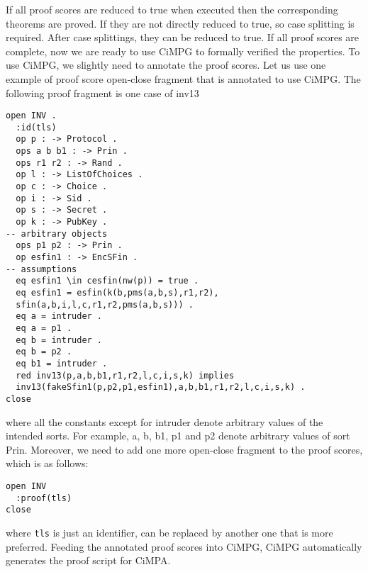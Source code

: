 \documentclass[a4paper,fleqn]{cas-dc}
\begin{document}
If all proof scores are reduced to true when executed then the corresponding theorems are proved. If they are not directly reduced to true, so case splitting is required. After case splittings, they can be reduced to true. If all proof scores are complete, now we are ready to use CiMPG to formally verified the properties. To use CiMPG, we slightly need to annotate the proof scores. Let us use one example of proof score open-close fragment that is annotated to use CiMPG. The following proof fragment is one case of inv13
\begin{small}
\begin{verbatim}
open INV .
  :id(tls)
  op p : -> Protocol .
  ops a b b1 : -> Prin .
  ops r1 r2 : -> Rand .
  op l : -> ListOfChoices .
  op c : -> Choice .
  op i : -> Sid .
  op s : -> Secret .
  op k : -> PubKey .
-- arbitrary objects
  ops p1 p2 : -> Prin .
  op esfin1 : -> EncSFin .
-- assumptions
  eq esfin1 \in cesfin(nw(p)) = true .
  eq esfin1 = esfin(k(b,pms(a,b,s),r1,r2),
  sfin(a,b,i,l,c,r1,r2,pms(a,b,s))) .
  eq a = intruder .
  eq a = p1 .
  eq b = intruder .
  eq b = p2 .
  eq b1 = intruder . 
  red inv13(p,a,b,b1,r1,r2,l,c,i,s,k) implies
  inv13(fakeSfin1(p,p2,p1,esfin1),a,b,b1,r1,r2,l,c,i,s,k) .
close
\end{verbatim}
\end{small}
where all the constants except for intruder denote arbitrary
values of the intended sorts. For example, a, b, b1, p1 and p2 denote arbitrary values of sort Prin. Moreover, we need to add one more open-close fragment to the proof scores, which is as follows:
\begin{small}
\begin{verbatim}
open INV
  :proof(tls)
close
\end{verbatim}
\end{small}
where \verb!tls! is just an identifier, can be replaced by another one that is more preferred. Feeding the annotated proof scores into CiMPG, CiMPG automatically generates the proof script for CiMPA.
\end{document}
